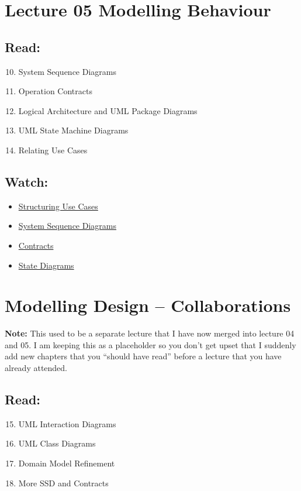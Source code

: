 \documentclass[10pt,t,a4paper]{article}
\begin{document}
\section{Lecture 05 Modelling Behaviour}
\label{sec:orgheadline15}
\subsection{Read:}
\label{sec:orgheadline13}
\begin{enumerate}
\setcounter{enumi}{9}
\item System Sequence Diagrams
\item Operation Contracts
\setcounter{enumi}{12}
\item Logical Architecture and UML Package Diagrams
\setcounter{enumi}{28}
\item UML State Machine Diagrams
\item Relating Use Cases
\end{enumerate}

\subsection{Watch:}
\label{sec:orgheadline14}
\begin{itemize}
\item \href{https://play.bth.se/media/Structuring+Use+Cases/1_seaeffad/41750261}{Structuring Use Cases}
\item \href{https://play.bth.se/media/SystemSequenceDiagrams.mp4/1_99i0cfv7/41750261}{System Sequence Diagrams}
\item \href{https://play.bth.se/media/Contracts/1_086yu2lr/41750261}{Contracts}
\item \href{https://play.bth.se/media/StateDiagrams.mp4/1_ruht53d3}{State Diagrams}
\end{itemize}
\section{Modelling Design -- Collaborations}
\label{sec:orgheadline18}
\textbf{Note:} This used to be a separate lecture that I have now merged into lecture 04 and 05. I am keeping this as a placeholder so you don't get upset that I suddenly add new chapters that you ``should have read'' before a lecture that you have already attended.
\subsection{Read:}
\label{sec:orgheadline16}
\begin{enumerate}
\setcounter{enumi}{14}
\item UML Interaction Diagrams
\item UML Class Diagrams
\setcounter{enumi}{30}
\item Domain Model Refinement
\item More SSD and Contracts
\end{enumerate}
\end{document}
